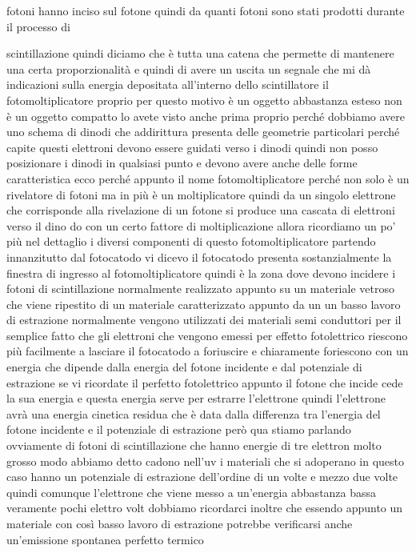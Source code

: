 {fotoni hanno inciso sul fotone quindi da quanti fotoni sono stati prodotti durante il processo di 

scintillazione quindi diciamo che è tutta una catena che permette di mantenere una certa proporzionalità e quindi di avere un uscita un segnale che mi dà indicazioni sulla energia depositata all'interno dello scintillatore il fotomoltiplicatore proprio per questo motivo è un oggetto abbastanza esteso non è un oggetto compatto lo avete visto anche prima proprio perché dobbiamo avere uno schema di dinodi che addirittura presenta delle geometrie particolari perché capite questi elettroni devono essere guidati verso i dinodi quindi non posso posizionare i dinodi in qualsiasi punto e devono avere anche delle forme caratteristica ecco perché appunto il nome fotomoltiplicatore perché non solo è un rivelatore di fotoni ma in più è un moltiplicatore quindi da un singolo elettrone che corrisponde alla rivelazione di un fotone si produce una cascata di elettroni verso il dino do con un certo fattore di moltiplicazione allora ricordiamo un po' più nel dettaglio i diversi componenti di questo fotomoltiplicatore partendo innanzitutto dal fotocatodo vi dicevo il fotocatodo presenta sostanzialmente la finestra di ingresso al fotomoltiplicatore quindi è la zona dove devono incidere i fotoni di scintillazione normalmente realizzato appunto su un materiale vetroso che viene ripestito di un materiale caratterizzato appunto da un un basso lavoro di estrazione normalmente vengono utilizzati dei materiali semi conduttori per il semplice fatto che gli elettroni che vengono emessi per effetto fotolettrico riescono più facilmente a lasciare il fotocatodo a foriuscire e chiaramente foriescono con un energia che dipende dalla energia del fotone incidente e dal potenziale di estrazione se vi ricordate il perfetto fotolettrico appunto il fotone che incide cede la sua energia e questa energia serve per estrarre l'elettrone quindi l'elettrone avrà una energia cinetica residua che è data dalla differenza tra l'energia del fotone incidente e il potenziale di estrazione però qua stiamo parlando ovviamente di fotoni di scintillazione che hanno energie di tre elettron molto grosso modo abbiamo detto cadono nell'uv i materiali che si adoperano in questo caso hanno un potenziale di estrazione dell'ordine di un volte e mezzo due volte quindi comunque l'elettrone che viene messo a un'energia abbastanza bassa veramente pochi elettro volt dobbiamo ricordarci inoltre che essendo appunto un materiale con così basso lavoro di estrazione potrebbe verificarsi anche un'emissione spontanea perfetto termico

}
